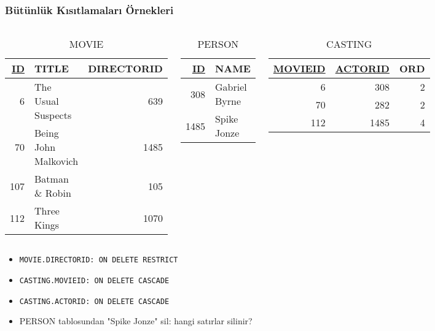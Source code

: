 \documentclass[dvipsnames]{beamer}
\theoremstyle{plain}
\begin{document}
\begin{frame}
  \frametitle{Bütünlük Kısıtlamaları Örnekleri}

  \begin{columns}[t]
    \begin{tiny}
    \begin{table}
      \caption{MOVIE}
      \begin{tabular}{|r|l|r|}\hline
\underline{ID} & TITLE             & DIRECTORID\\[2pt]\hline\hline
          6 & The Usual Suspects   &        639\\\hline
         70 & Being John Malkovich &       1485\\\hline
        107 & Batman \& Robin      &        105\\\hline
        112 & Three Kings          &       1070\\\hline
      \end{tabular}
    \end{table}
    \end{tiny}

    \begin{tiny}
    \begin{table}
      \caption{PERSON}
      \begin{tabular}{|r|l|}\hline
\underline{ID} & NAME\\[2pt]\hline\hline
           308 & Gabriel Byrne\\\hline
          1485 & Spike Jonze  \\\hline
      \end{tabular}
    \end{table}
    \end{tiny}

    \begin{tiny}
    \begin{table}
      \caption{CASTING}
      \begin{tabular}{|r|r|r|}\hline
\underline{MOVIEID} & \underline{ACTORID} & ORD\\[2pt]\hline\hline
                  6 &                 308 &   2\\\hline
                 70 &                 282 &   2\\\hline
                112 &                1485 &   4\\\hline
      \end{tabular}
    \end{table}
    \end{tiny}
  \end{columns}

  \begin{itemize}
    \item \lstinline!MOVIE.DIRECTORID: ON DELETE RESTRICT!
    \item \lstinline!CASTING.MOVIEID: ON DELETE CASCADE!
    \item \lstinline!CASTING.ACTORID: ON DELETE CASCADE!
    \smallskip
    \item PERSON tablosundan "Spike Jonze" sil: hangi satırlar silinir?
  \end{itemize}
\end{frame}
\end{document}
